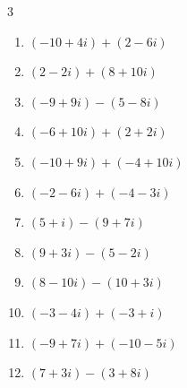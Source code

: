 \begin{multicols}{3}
\begin{enumerate}
        \phantom{$\displaystyle =6-16i$}

  \item $\displaystyle (-10+4i) + (2-6i)$

        \phantom{$\displaystyle =-8-2i$}

  \item $\displaystyle (2-2i) + (8+10i)$

        \phantom{$\displaystyle =10+8i$}

  \item $\displaystyle (-9+9i) - (5-8i)$

        \phantom{$\displaystyle =-14+17i$}

  \item $\displaystyle (-6+10i) + (2+2i)$

        \phantom{$\displaystyle =-4+12i$}

\columnbreak %

\resetques

  \item $\displaystyle (-10+9i) + (-4+10i)$

        \phantom{$\displaystyle =-14+19i$}

  \item $\displaystyle (-2-6i) + (-4-3i)$

        \phantom{$\displaystyle =-6-9i$}

  \item $\displaystyle (5+i) - (9+7i)$

        \phantom{$\displaystyle =-4-6i$}

  \item $\displaystyle (9+3i) - (5-2i)$

        \phantom{$\displaystyle =4+5i$}

  \item $\displaystyle (8-10i) - (10+3i)$

        \phantom{$\displaystyle =-2-13i$}

  \item $\displaystyle (-3-4i) + (-3+i)$

        \phantom{$\displaystyle =-6-3i$}

  \item $\displaystyle (-9+7i) + (-10-5i)$

        \phantom{$\displaystyle =-19+2i$}

  \item $\displaystyle (7+3i) - (3+8i)$

        \phantom{$\displaystyle =4-5i$}


\end{enumerate}
\end{multicols}
